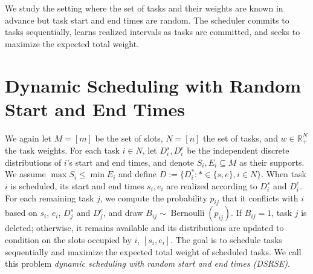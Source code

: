 \documentclass{article}
\newcommand{\R}{\mathbb{R}}
\begin{document}
We study the setting where the set of tasks and their weights are known in advance but task start and end times are random.
The scheduler commits to tasks sequentially, learns realized intervals as tasks are committed, and seeks to maximize the expected total weight.

\section{Dynamic Scheduling with Random Start and End Times}
We again let $M=[m]$ be the set of slots, $N=[n]$ the set of tasks, and $w\in\R_{+}^{N}$ the task weights. 
For each task $i\in N$, let $D_i^s,D_i^e$ be the independent discrete distributions of $i$'s start and end times, and denote $S_i,E_i\subseteq M$ as their supports.
We assume $\max S_i\leq \min E_i$ and define $D:=\{D_i^*:*\in\{s,e\},i\in N\}$.
When task $i$ is scheduled, its start and end times $s_i,e_i$ are realized according to $D_i^s$ and $D_i^e$. 
For each remaining task $j$, we compute the probability $p_{ij}$ that it conflicts with $i$ based on $s_i$, $e_i$, $D_j^s$ and $D_j^e$, and draw $B_{ij}\sim\operatorname{Bernoulli}(p_{ij})$.
If $B_{ij}=1$, task $j$ is deleted; otherwise, it remains available and its distributions are updated to condition on the slots occupied by $i$, $[s_i, e_i]$. 
The goal is to schedule tasks sequentially and maximize the expected total weight of scheduled tasks.
We call this problem \emph{dynamic scheduling with random start and end times (DSRSE)}.
\end{document}
